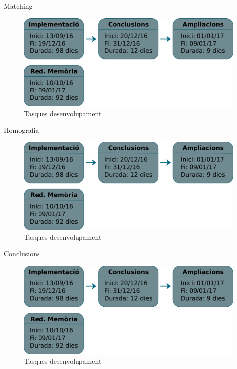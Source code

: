 \documentclass[xcolor=table]{beamer}
\begin{document}
	\begin{frame}{Matching}
		\centering
		\begin{figure}
			\includegraphics[width=\textwidth-1cm]{tasques}
			\vspace{0.2cm}
			\caption{Tasques desenvolupament}
		\end{figure}
	\end{frame}

	\begin{frame}{Homografia}
		\centering
		\begin{figure}
			\includegraphics[width=\textwidth-1cm]{tasques}
			\vspace{0.2cm}
			\caption{Tasques desenvolupament}
		\end{figure}
	\end{frame}

	\begin{frame}{Conclusions}
		\centering
		\begin{figure}
			\includegraphics[width=\textwidth-1cm]{tasques}
			\vspace{0.2cm}
			\caption{Tasques desenvolupament}
		\end{figure}
	\end{frame}
\end{document}
